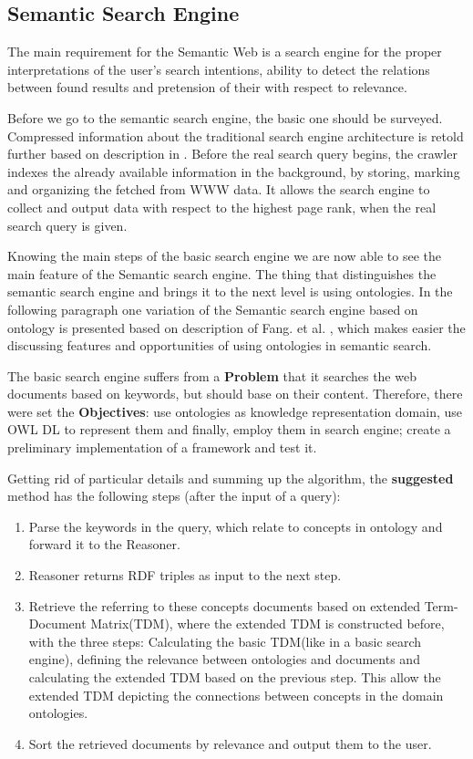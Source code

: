 		
		\subsection{Semantic Search Engine}
		The main requirement for the Semantic Web is a search engine for the proper interpretations of the user's search intentions, ability to detect the relations between found results and pretension of their with respect to relevance.
		
		Before we go to the semantic search engine, the basic one should be surveyed. Compressed information about the traditional search engine architecture is retold further based on description in \cite{Gup12}. Before the real search query begins, the crawler indexes the already available information in the background, by  storing, marking and organizing the fetched from WWW data. It allows the search engine to collect and output data with respect to the highest page rank, when the real search query is given.
		
		Knowing the main steps of the basic search engine we are now able to see the main feature of the Semantic search engine. The thing that distinguishes the semantic search engine and brings it to the next level is using ontologies. In the following paragraph one variation of the Semantic search engine based on ontology is presented based on description of Fang. et al. \cite{Fang05}, which makes easier the discussing features and opportunities of using ontologies in semantic search.
		        
		The basic search engine suffers from a \textbf{Problem} that it searches the web documents based on keywords, but should base on their content. Therefore, there were set the \textbf{Objectives}: use ontologies as knowledge representation domain, use OWL DL to represent them and finally, employ them in search engine; create a preliminary implementation of a framework and test it. 
		
		Getting rid of particular details and summing up the algorithm, the \textbf{suggested} method has the following steps (after the input of a query):
			\begin{enumerate}
				\item Parse the keywords in the query, which relate to concepts in ontology and forward it to the Reasoner.
				\item Reasoner returns RDF triples as input to the next step.
				\item Retrieve the referring to these concepts documents based on extended Term-Document Matrix(TDM), where the extended TDM is constructed before, with the three steps: Calculating the basic TDM(like in a basic search engine), defining the relevance between ontologies and documents and calculating the extended TDM based on the previous step. This allow the extended TDM depicting the connections between concepts in the domain ontologies.
				\item Sort the retrieved documents by relevance and output them to the user.   
			\end{enumerate}
		
